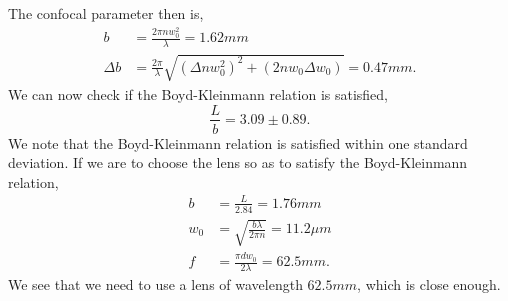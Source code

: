 The confocal parameter then is,
\begin{equation}
\begin{split}
    b &= \frac{2\pi n w_0^2}{\lambda} = 1.62mm \\
    \Delta b &= \frac{2\pi}{\lambda}\sqrt{(\Delta nw_0^2)^2 + (2nw_0\Delta w_0)} = 0.47mm.
\end{split}
\end{equation}
We can now check if the Boyd-Kleinmann relation is satisfied,
\begin{equation}
    \frac{L}{b} = 3.09 \pm 0.89.
\end{equation}
We note that the Boyd-Kleinmann relation is satisfied within one standard deviation. If we are to choose the lens so as to satisfy the Boyd-Kleinmann relation,
\begin{equation}
\begin{split}
    b &= \frac{L}{2.84} = 1.76mm \\
    w_0 &= \sqrt{\frac{b\lambda}{2\pi n}} = 11.2 \mu m \\
    f &= \frac{\pi d w_0}{2 \lambda} = 62.5 mm.
\end{split}
\end{equation}
We see that we need to use a lens of wavelength $62.5mm$, which is close enough.
